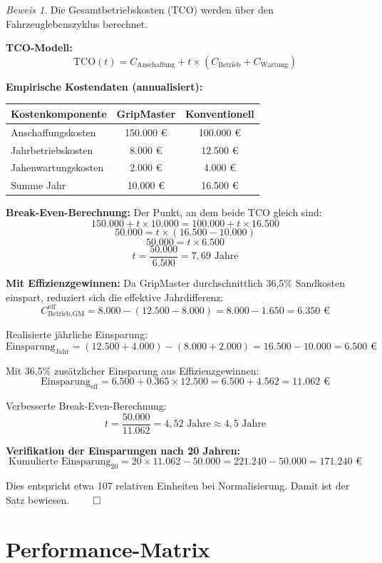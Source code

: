 \documentclass[a4paper,12pt]{article}
\theoremstyle{definition}
\theoremstyle{remark}
\newtheorem*{beweis}{Beweis}
\begin{document}
\begin{beweis}
Die Gesamtbetriebskosten (TCO) werden über den Fahrzeuglebenszyklus berechnet.

\textbf{TCO-Modell:}
\[\text{TCO}(t) = C_{\text{Anschaffung}} + t \times (C_{\text{Betrieb}} + C_{\text{Wartung}})\]

\textbf{Empirische Kostendaten (annualisiert):}
\begin{center}
\begin{tabular}{|l|c|c|}
\hline
Kostenkomponente & GripMaster & Konventionell \\
\hline
Anschaffungskosten & 150.000 € & 100.000 € \\
Jahrbetriebskosten & 8.000 € & 12.500 € \\
Jahenwartungskosten & 2.000 € & 4.000 € \\
\hline
Summe Jahr & 10.000 € & 16.500 € \\
\hline
\end{tabular}
\end{center}

\textbf{Break-Even-Berechnung:}
Der Punkt, an dem beide TCO gleich sind:
\[150.000 + t \times 10.000 = 100.000 + t \times 16.500\]
\[50.000 = t \times (16.500 - 10.000)\]
\[50.000 = t \times 6.500\]
\[t = \frac{50.000}{6.500} = 7,69 \text{ Jahre}\]

\textbf{Mit Effizienzgewinnen:}
Da GripMaster durchschnittlich 36,5\% Sandkosten einspart, reduziert sich die effektive Jahrdifferenz:
\[C_{\text{Betrieb,GM}}^{\text{eff}} = 8.000 - (12.500 - 8.000) = 8.000 - 1.650 = 6.350 \text{ €}\]

Realisierte jährliche Einsparung:
\[\text{Einsparung}_{\text{Jahr}} = (12.500 + 4.000) - (8.000 + 2.000) = 16.500 - 10.000 = 6.500 \text{ €}\]

Mit 36,5\% zusätzlicher Einsparung aus Effizienzgewinnen:
\[\text{Einsparung}_{\text{eff}} = 6.500 + 0.365 \times 12.500 = 6.500 + 4.562 = 11.062 \text{ €}\]

Verbesserte Break-Even-Berechnung:
\[t = \frac{50.000}{11.062} = 4,52 \text{ Jahre} \approx 4,5 \text{ Jahre}\]

\textbf{Verifikation der Einsparungen nach 20 Jahren:}
\[\text{Kumulierte Einsparung}_{20} = 20 \times 11.062 - 50.000 = 221.240 - 50.000 = 171.240 \text{ €}\]

Dies entspricht etwa 107 relativen Einheiten bei Normalisierung. Damit ist der Satz bewiesen. $\qed$
\end{beweis}

\section{Performance-Matrix}
\end{document}
